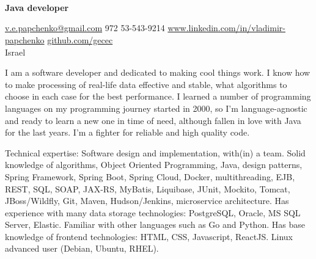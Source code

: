 \documentclass[10pt,a4paper]{article}
\begin{document}
\sloppy  %


\\\\\\
{\bf Java developer}

\nobreakvspace{0.3em}  %

\noindent\href{mailto:v.e.papchenko.at.gmail.dot.com}{v.e.papchenko\mbox{}@\mbox{}gmail.com}\sbull
\textsmaller{+}972 53-543-9214\sbull
\href{https://www.linkedin.com/in/vladimir-papchenko}{www.linkedin.com/in/vladimir-papchenko}\sbull
\href{https://github.com/gecec}{github.com/gecec}
\\
Israel

\spacedhrule{0.9em}{-0.4em}  %


\inlineheadsection
\noindent
{}
I am a software developer and dedicated to making cool things work. I know how to make processing of real-life data effective and stable, what algorithms to choose in each case for the best performance. I learned a number of programming languages on my programming journey started in 2000, so I'm language-agnostic and ready to learn a new one in time of need, although fallen in love with Java for the last years. I'm a fighter for reliable and high quality code.

\spacedhrule{0.2em}{-0.3em}

\inlineheadsection  %
  {Technical expertise:}
  {Software design and implementation, with(in) a team. Solid knowledge of algorithms, Object Oriented Programming, Java, design patterns, Spring Framework, Spring Boot, Spring Cloud, Docker, multithreading, EJB, REST, SQL, SOAP, JAX-RS, MyBatis, Liquibase, JUnit, Mockito, Tomcat, JBoss/Wildfly, Git, Maven, Hudson/Jenkins, microservice architecture. Has experience with many data storage technologies: PostgreSQL, Oracle, MS SQL Server, Elastic. Familiar with other languages such as Go and Python. Has base knowledge of frontend technologies: HTML, CSS, Javascript, ReactJS. Linux advanced user (Debian, Ubuntu, RHEL).}
\end{document}
